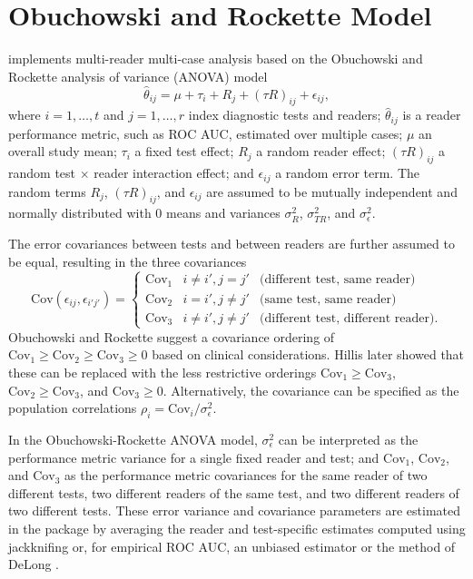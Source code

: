 \documentclass[
]{jss}
\begin{document}
\hypertarget{obuchowski-and-rockette-model}{%
\section{Obuchowski and Rockette
Model}\label{obuchowski-and-rockette-model}}

 implements multi-reader multi-case analysis based on the
Obuchowski and Rockette \citeyearpar{Obuchowski:1995:HTD} analysis of
variance (ANOVA) model \[
\hat{\theta}_{ij} = \mu + \tau_i + R_j + (\tau R)_{ij} + \epsilon_{ij},
\] where \(i = 1,\ldots,t\) and \(j = 1,\ldots,r\) index diagnostic
tests and readers; \(\hat{\theta}_{ij}\) is a reader performance metric,
such as ROC AUC, estimated over multiple cases; \(\mu\) an overall study
mean; \(\tau_i\) a fixed test effect; \(R_j\) a random reader effect;
\((\tau R)_{ij}\) a random test \(\times\) reader interaction effect;
and \(\epsilon_{ij}\) a random error term. The random terms \(R_j\),
\((\tau R)_{ij}\), and \(\epsilon_{ij}\) are assumed to be mutually
independent and normally distributed with 0 means and variances
\(\sigma^2_R\), \(\sigma^2_{TR}\), and \(\sigma^2_\epsilon\).

The error covariances between tests and between readers are further
assumed to be equal, resulting in the three covariances \[
\text{Cov}(\epsilon_{ij}, \epsilon_{i'j'}) = \left\{
  \begin{array}{lll}
    \text{Cov}_1 & i \ne i', j = j' & \text{(different test, same reader)} \\
    \text{Cov}_2 & i = i', j \ne j' & \text{(same test, same reader)} \\
    \text{Cov}_3 & i \ne i', j \ne j' & \text{(different test, different reader)}.
  \end{array}
\right.
\] Obuchowski and Rockette \citeyearpar{Obuchowski:1995:HTD} suggest a
covariance ordering of
\(\text{Cov}_1 \ge \text{Cov}_2 \ge \text{Cov}_3 \ge 0\) based on
clinical considerations. Hillis \citeyearpar{Hillis:2014:MMA} later
showed that these can be replaced with the less restrictive orderings
\(\text{Cov}_1 \ge \text{Cov}_3\), \(\text{Cov}_2 \ge \text{Cov}_3\),
and \(\text{Cov}_3 \ge 0\). Alternatively, the covariance can be
specified as the population correlations
\(\rho_i = \text{Cov}_i / \sigma^2_\epsilon\).

In the Obuchowski-Rockette ANOVA model, \(\sigma^2_\epsilon\) can be
interpreted as the performance metric variance for a single fixed reader
and test; and \(\text{Cov}_1\), \(\text{Cov}_2\), and \(\text{Cov}_3\)
as the performance metric covariances for the same reader of two
different tests, two different readers of the same test, and two
different readers of two different tests. These error variance and
covariance parameters are estimated in the package by averaging the
reader and test-specific estimates computed using jackknifing
\citep{Efron:1982:JBR} or, for empirical ROC AUC, an unbiased estimator
\citep{Gallas:2007:MMV} or the method of DeLong \citep{DeLong:1988:CAU}.
\end{document}
